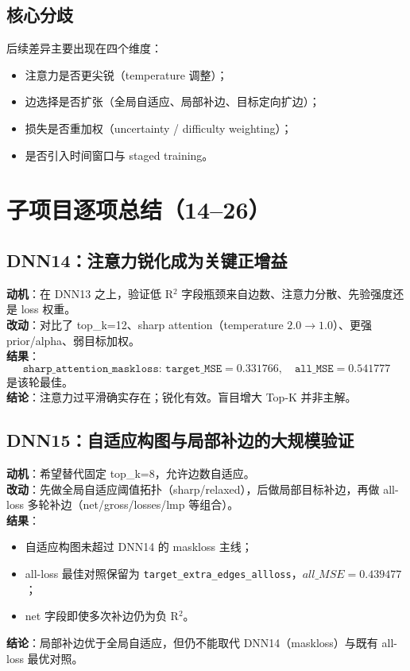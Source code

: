 \documentclass[UTF8]{ctexart}
\begin{document}
\subsection{核心分歧}

后续差异主要出现在四个维度：
\begin{itemize}
    \item 注意力是否更尖锐（temperature 调整）；
    \item 边选择是否扩张（全局自适应、局部补边、目标定向扩边）；
    \item 损失是否重加权（uncertainty / difficulty weighting）；
    \item 是否引入时间窗口与 staged training。
\end{itemize}

\section{子项目逐项总结（14--26）}

\subsection{DNN14：注意力锐化成为关键正增益}

\textbf{动机}：在 DNN13 之上，验证低 R\(^2\) 字段瓶颈来自边数、注意力分散、先验强度还是 loss 权重。\\
\textbf{改动}：对比了 top\_k=12、sharp attention（temperature \(2.0\rightarrow1.0\)）、更强 prior/alpha、弱目标加权。\\
\textbf{结果}：
\[
\texttt{sharp\_attention\_maskloss: target\_MSE}=0.331766,\quad \texttt{all\_MSE}=0.541777
\]
是该轮最佳。\\
\textbf{结论}：注意力过平滑确实存在；锐化有效。盲目增大 Top-K 并非主解。

\subsection{DNN15：自适应构图与局部补边的大规模验证}

\textbf{动机}：希望替代固定 top\_k=8，允许边数自适应。\\
\textbf{改动}：先做全局自适应阈值拓扑（sharp/relaxed），后做局部目标补边，再做 all-loss 多轮补边（net/gross/losses/lmp 等组合）。\\
\textbf{结果}：
\begin{itemize}
    \item 自适应构图未超过 DNN14 的 maskloss 主线；
    \item all-loss 最佳对照保留为 \texttt{target\_extra\_edges\_allloss}，\(all\_MSE=0.439477\)；
    \item net 字段即使多次补边仍为负 R\(^2\)。
\end{itemize}
\textbf{结论}：局部补边优于全局自适应，但仍不能取代 DNN14（maskloss）与既有 all-loss 最优对照。
\end{document}
